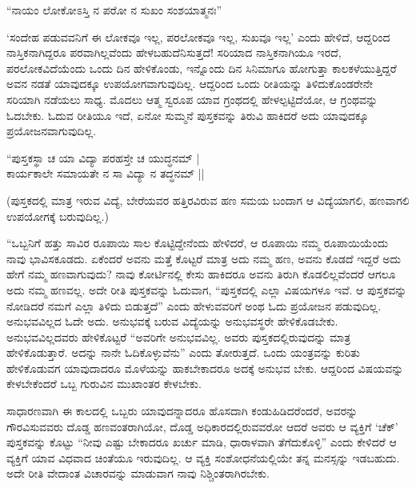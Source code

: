 \begin{shloka}
``ನಾಯಂ ಲೋಕೋಽಸ್ತಿ ನ ಪರೋ ನ ಸುಖಂ ಸಂಶಯಾತ್ಮನಃ''
\end{shloka}

`ಸಂದೇಹ ಪಡುವವನಿಗೆ ಈ ಲೋಕವೂ ಇಲ್ಲ, ಪರಲೋಕವೂ ಇಲ್ಲ, ಸುಖವೂ ಇಲ್ಲ' ಎಂದು ಹೇಳಿದೆ, ಆದ್ದರಿಂದ ನಾಸ್ತಿಕನಾಗಿದ್ದರೂ ಪರವಾಗಿಲ್ಲವೆಂದು ಹೇಳಬಹುದೆನಿಸುತ್ತದೆ! ಸರಿಯಾದ ನಾಸ್ತಿಕನಾಗಿಯೂ ಇರದೆ, ಪರಲೋಕವಿದೆಯೆಂದು ಒಂದು ದಿನ ಹೇಳಿಕೊಂಡು, ಇನ್ನೊಂದು ದಿನ ಸಿನಿಮಾಗೂ ಹೋಗುತ್ತಾ ಕಾಲಕಳೆಯುತ್ತಿದ್ದರೆ ಅವನ ನಡತೆ ಯಾವುದಕ್ಕೂ ಉಪಯೋಗವಾಗುವುದಿಲ್ಲ. ಆದ್ದರಿಂದ ಒಂದು ರೀತಿಯನ್ನು ತಿಳಿದುಕೊಂಡರೇನೇ ಸರಿಯಾಗಿ ನಡೆಯಲು ಸಾಧ್ಯ. ಮೊದಲು ಆತ್ಮ ಸ್ವರೂಪ ಯಾವ ಗ್ರಂಥದಲ್ಲಿ ಹೇಳಲ್ಪಟ್ಟಿದೆಯೋ, ಆ ಗ್ರಂಥವನ್ನು ಓದಬೇಕು. ಓದುವ ರೀತಿಯೂ ಇದೆ, ಏನೋ ಸುಮ್ಮನೆ ಪುಸ್ತಕವನ್ನು ತಿರುವಿ ಹಾಕಿದರೆ ಅದು ಯಾವುದಕ್ಕೂ ಪ್ರಯೋಜನವಾಗುವುದಿಲ್ಲ.

\begin{shloka}
``ಪುಸ್ತಕಸ್ಥಾ ಚ ಯಾ ವಿದ್ಯಾ ಪರಹಸ್ತೇ ಚ ಯುದ್ಧನಮ್ |\\
ಕಾರ್ಯಕಾಲೇ ಸಮಾಯತೇ ನ ಸಾ ವಿದ್ಯಾ ನ ತದ್ಧನಮ್ ||
\end{shloka}

(ಪುಸ್ತಕದಲ್ಲಿ ಮಾತ್ರ ಇರುವ ವಿದ್ಯೆ, ಬೇರೆಯವರ ಹತ್ತಿರವಿರುವ ಹಣ ಸಮಯ ಬಂದಾಗ ಆ ವಿದ್ಯೆಯಾಗಲಿ, ಹಣವಾಗಲಿ ಉಪಯೋಗಕ್ಕೆ ಬರುವುದಿಲ್ಲ.)

``ಒಬ್ಬನಿಗೆ ಹತ್ತು ಸಾವಿರ ರೂಪಾಯಿ ಸಾಲ ಕೊಟ್ಟಿದ್ದೇನೆಂದು ಹೇಳಿದರೆ, ಆ ರೂಪಾಯಿ ನಮ್ಮ ರೂಪಾಯಿಯೆಂದು ನಾವು ಭಾವಿಸಕೂಡದು. ಏಕೆಂದರೆ ಅವನು ಮತ್ತೆ ಕೊಟ್ಟರೆ ಮಾತ್ರ ಅದು ನಮ್ಮ ಹಣ, ಅವನು ಕೊಡದೆ ಇದ್ದರೆ ಅದು ಹೇಗೆ ನಮ್ಮ ಹಣವಾಗುವುದು? ನಾವು ಕೋರ್ಟಿನಲ್ಲಿ ಕೇಸು ಹಾಕಿದರೂ ಅವನು ತಿರುಗಿ ಕೊಡಲಿಲ್ಲವೆಂದರೆ ಆಗಲೂ ಅದು ನಮ್ಮ ಹಣವಲ್ಲ. ಅದೇ ರೀತಿ ಪುಸ್ತಕವನ್ನು ಓದುವಾಗ, ``ಪುಸ್ತಕದಲ್ಲಿ ಎಲ್ಲಾ ವಿಷಯಗಳೂ ಇವೆ. ಆ ಪುಸ್ತಕವನ್ನು ನೋಡಿದರೆ ನಮಗೆ ಎಲ್ಲಾ ತಿಳಿದು ಬಿಡುತ್ತದೆ'' ಎಂದು ಹೇಳುವವರಿಗೆ ಅಂಥ ಓದು ಪ್ರಯೋಜನ ಪಡುವುದಿಲ್ಲ. ಅನುಭವವಿಲ್ಲದ ಓದೇ ಅದು. ಅನುಭವಕ್ಕೆ ಬರುವ ವಿದ್ಯೆಯನ್ನು ಅನುಭವಸ್ಥರೇ ಹೇಳಿಕೊಡಬೇಕು. ಅನುಭವವಿಲ್ಲದವರು ಹೇಳಿಕೊಟ್ಟರೆ ``ಅವರಿಗೇ ಅನುಭವವಿಲ್ಲ. ಅವರು ಪುಸ್ತಕದಲ್ಲಿರುವುದನ್ನು ಮಾತ್ರ ಹೇಳಿಕೊಡುತ್ತಾರೆ. ಅದನ್ನು ನಾನೇ ಓದಿಕೊಳ್ಳುವೆನು'' ಎಂದು ತೋರುತ್ತದೆ. ಒಂದು ಯಂತ್ರವನ್ನು ಕುರಿತು ಹೇಳಿಕೊಡುವಗ ಯಾವುದಾದರೂ ಮೊಳೆಯನ್ನು ಹಾಕಬೇಕಾದರೂ ಅದಕ್ಕೆ ಅನುಭವ ಬೇಕು. ಆದ್ದರಿಂದ ವಿಷಯವನ್ನು ಕೇಳಬೇಕೆಂದರೆ ಒಬ್ಬ ಗುರುವಿನ ಮುಖಾಂತರ ಕೇಳಬೇಕು.

ಸಾಧಾರಣವಾಗಿ ಈ ಕಾಲದಲ್ಲಿ ಒಬ್ಬರು ಯಾವುದನ್ನಾದರೂ ಹೊಸದಾಗಿ ಕಂಡುಹಿಡಿದರೆಂದರೆ, ಅವರನ್ನು ಗೌರವಿಸುವವರು ದೊಡ್ಡ ಹಣವಂತರಾಗಿಯೋ, ದೊಡ್ಡ ಅಧಿಕಾರದಲ್ಲಿರುವವರೋ ಆದರೆ ಅವರು ಆ ವ್ಯಕ್ತಿಗೆ `ಚೆಕ್' ಪುಸ್ತಕವನ್ನು ಕೊಟ್ಟು ``ನೀವು ಎಷ್ಟು ಬೇಕಾದರೂ ಖರ್ಚು ಮಾಡಿ, ಧಾರಾಳವಾಗಿ ತೆಗೆದುಕೊಳ್ಳಿ'' ಎಂದು ಕೇಳಿದರೆ ಆ ವ್ಯಕ್ತಿಗೆ ಯಾವ ವಿಧವಾದ ಚಿಂತೆಯೂ ಇರುವುದಿಲ್ಲ. ಆ ವ್ಯಕ್ತಿ ಸಂಶೋಧನೆಯಲ್ಲಿಯೇ ತನ್ನ ಮನಸ್ಸನ್ನು ಇಡಬಹುದು. ಅದೇ ರೀತಿ ವೇದಾಂತ ವಿಚಾರವನ್ನು ಮಾಡುವಾಗ ನಾವು ನಿಶ್ಚಿಂತರಾಗಿರಬೇಕು.

